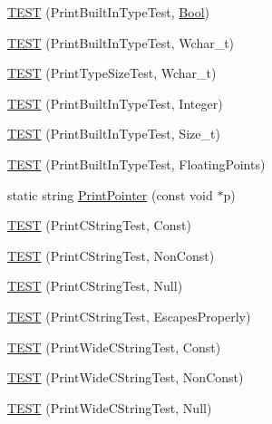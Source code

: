 \begin{DoxyCompactItemize}
\item 
\hyperlink{namespacetesting_1_1gtest__printers__test_a6f08c464dc0b8eb822368f552d4467ad}{\-T\-E\-S\-T} (\-Print\-Built\-In\-Type\-Test, \hyperlink{structBool}{\-Bool})
\item 
\hyperlink{namespacetesting_1_1gtest__printers__test_ab567ebd97eff0a4b9a20a5f5cb77d678}{\-T\-E\-S\-T} (\-Print\-Built\-In\-Type\-Test, \-Wchar\-\_\-t)
\item 
\hyperlink{namespacetesting_1_1gtest__printers__test_a705ec4c2886606a22194107397fceea6}{\-T\-E\-S\-T} (\-Print\-Type\-Size\-Test, \-Wchar\-\_\-t)
\item 
\hyperlink{namespacetesting_1_1gtest__printers__test_a278d53e99390c7b31ff531524fe5e86e}{\-T\-E\-S\-T} (\-Print\-Built\-In\-Type\-Test, \-Integer)
\item 
\hyperlink{namespacetesting_1_1gtest__printers__test_a991dc124d153742c3ca126b2fa9ccab5}{\-T\-E\-S\-T} (\-Print\-Built\-In\-Type\-Test, \-Size\-\_\-t)
\item 
\hyperlink{namespacetesting_1_1gtest__printers__test_acde0b28d177604ddb5e185d7b107f6f7}{\-T\-E\-S\-T} (\-Print\-Built\-In\-Type\-Test, \-Floating\-Points)
\item 
static string \hyperlink{namespacetesting_1_1gtest__printers__test_a647fd599f6c81755c3cff8ceeba1740d}{\-Print\-Pointer} (const void $\ast$p)
\item 
\hyperlink{namespacetesting_1_1gtest__printers__test_a6cd47b21ad8d9ac66ba57b5b6415a924}{\-T\-E\-S\-T} (\-Print\-C\-String\-Test, \-Const)
\item 
\hyperlink{namespacetesting_1_1gtest__printers__test_a89d9905fecee1b976c26d35498734dd4}{\-T\-E\-S\-T} (\-Print\-C\-String\-Test, \-Non\-Const)
\item 
\hyperlink{namespacetesting_1_1gtest__printers__test_ad29b97d58a4d1e5e8dd4d854f66b9e22}{\-T\-E\-S\-T} (\-Print\-C\-String\-Test, \-Null)
\item 
\hyperlink{namespacetesting_1_1gtest__printers__test_a140030b990011abab91d4c0b59f21edd}{\-T\-E\-S\-T} (\-Print\-C\-String\-Test, \-Escapes\-Properly)
\item 
\hyperlink{namespacetesting_1_1gtest__printers__test_a4caa1f81979cdc6f5ada95e01a4fae63}{\-T\-E\-S\-T} (\-Print\-Wide\-C\-String\-Test, \-Const)
\item 
\hyperlink{namespacetesting_1_1gtest__printers__test_a8812b5f088e13083ebb8a7e35fbcdae7}{\-T\-E\-S\-T} (\-Print\-Wide\-C\-String\-Test, \-Non\-Const)
\item 
\hyperlink{namespacetesting_1_1gtest__printers__test_acd1267d49d61ad53b2b8a88f68fca3a7}{\-T\-E\-S\-T} (\-Print\-Wide\-C\-String\-Test, \-Null)

\end{DoxyCompactItemize}
